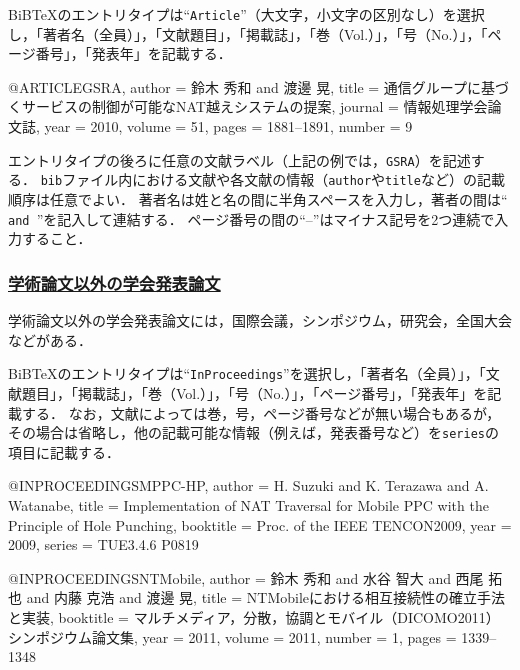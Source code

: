\documentclass[a4j,11pt]{ujreport}
\begin{document}
BiB{\TeX}のエントリタイプは``\texttt{Article}''（大文字，小文字の区別なし）を選択し，「著者名（全員）」，「文献題目」，「掲載誌」，「巻（Vol.）」，「号（No.）」，「ページ番号」，「発表年」を記載する．

\begin{code}
@ARTICLE{GSRA,
  author = {鈴木 秀和 and 渡邊 晃},
  title = {通信グループに基づくサービスの制御が可能なNAT越えシステムの提案},
  journal = {情報処理学会論文誌},
  year = {2010},
  volume = {51},
  pages = {1881--1891},
  number = {9}
}
\end{code}

エントリタイプの後ろに任意の文献ラベル（上記の例では，\texttt{GSRA}）を記述する．
\texttt{bib}ファイル内における文献や各文献の情報（\texttt{author}や\texttt{title}など）の記載順序は任意でよい．
著者名は姓と名の間に半角スペースを入力し，著者の間は``\texttt{ and }''を記入して連結する．
ページ番号の間の``--''はマイナス記号を2つ連続で入力すること．

\subsubsection{\underline{学術論文以外の学会発表論文}}
学術論文以外の学会発表論文には，国際会議，シンポジウム，研究会，全国大会などがある．

BiB{\TeX}のエントリタイプは``\texttt{InProceedings}''を選択し，「著者名（全員）」，「文献題目」，「掲載誌」，「巻（Vol.）」，「号（No.）」，「ページ番号」，「発表年」を記載する．
なお，文献によっては巻，号，ページ番号などが無い場合もあるが，その場合は省略し，他の記載可能な情報（例えば，発表番号など）を\texttt{series}の項目に記載する．

\begin{code}
@INPROCEEDINGS{MPPC-HP,
  author = {H. Suzuki and K. Terazawa and A. Watanabe},
  title = {Implementation of NAT Traversal for Mobile PPC with the Principle of
           Hole Punching},
  booktitle = {Proc. of the IEEE TENCON2009},
  year = {2009},
  series = {TUE3.4.6 P0819}
}
\end{code}

\begin{code}
@INPROCEEDINGS{NTMobile,
  author = {鈴木 秀和 and 水谷 智大 and 西尾 拓也 and 内藤 克浩 and 渡邊 晃},
  title = {NTMobileにおける相互接続性の確立手法と実装},
  booktitle = {マルチメディア，分散，協調とモバイル（DICOMO2011）シンポジウム論文集},
  year = {2011},
  volume = {2011},
  number = {1},
  pages = {1339--1348}
}
\end{code}
\end{document}
